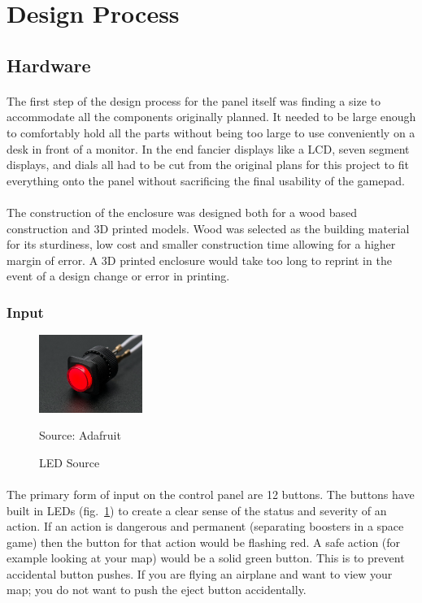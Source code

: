 \documentclass[12pt,a4paper]{article}
\newcommand{\source}[1]{\vspace{-0.6cm}\caption*{Source: {#1}} }
\begin{document}
\section{Design Process}
\subsection{Hardware}
\paragraph{}
The first step of the design process for the panel itself was finding a size to accommodate all the components originally planned. It needed to be large enough to comfortably hold all the parts without being too large to use conveniently on a desk in front of a monitor. In the end fancier displays like a \gls{LCD}, seven segment displays, and dials all had to be cut from the original plans for this project to fit everything onto the panel without sacrificing the final usability of the gamepad.
\paragraph{}
The construction of the enclosure was designed both for a wood based construction and 3D printed models. Wood was selected as the building material for its sturdiness, low cost and smaller construction time allowing for a higher margin of error. A 3D printed enclosure would take too long to reprint in the event of a design change or error in printing.
\newpage
\subsubsection{Input}
\begin{figure}
	\vspace*{-0.5cm}
	\centering
	\includegraphics[width=0.3\textwidth]{button}
	\caption{LED Source}
	\source{Adafruit}
	\label{fig:button}
\end{figure}
\paragraph{}
The primary form of input on the control panel are 12 buttons. The buttons have built in \glspl{LED} (fig.~\ref{fig:button}) to create a clear sense of the status and severity of an action. If an action is dangerous and  permanent (separating boosters in a space game) then the button for that action would be flashing red. A safe action (for example looking at your map) would be a solid green button. This is to prevent accidental button pushes. If you are flying an airplane and want to view your map; you do not want to push the eject button accidentally.
\end{document}
